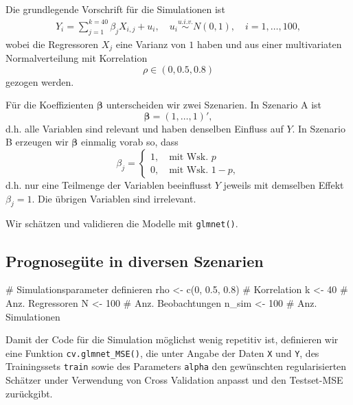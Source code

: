 \documentclass[
  a4paper,
  DIV=11,
  oneside]{scrreprt}
\newenvironment{Shaded}{\begin{snugshade}}{\end{snugshade}}
\newcommand{\CommentTok}[1]{\textcolor[rgb]{0.37,0.37,0.37}{#1}}
\newcommand{\DecValTok}[1]{\textcolor[rgb]{0.68,0.00,0.00}{#1}}
\newcommand{\FloatTok}[1]{\textcolor[rgb]{0.68,0.00,0.00}{#1}}
\newcommand{\FunctionTok}[1]{\textcolor[rgb]{0.28,0.35,0.67}{#1}}
\newcommand{\NormalTok}[1]{\textcolor[rgb]{0.00,0.23,0.31}{#1}}
\newcommand{\OtherTok}[1]{\textcolor[rgb]{0.00,0.23,0.31}{#1}}
\begin{document}
Die grundlegende Vorschrift für die Simulationen ist \begin{align*}
  Y_i = \sum_{j=1}^{k=40} \beta_j X_{i,j} + u_i, \quad u_i \overset{u.i.v.}{\sim} N(0,1), \quad i=1,\dots,100,
\end{align*} wobei die Regressoren \(X_j\) eine Varianz von \(1\) haben
und aus einer multivariaten Normalverteilung mit Korrelation
\[\rho\in(0,0.5,0.8)\] gezogen werden.

Für die Koeffizienten \(\boldsymbol{\beta}\) unterscheiden wir zwei
Szenarien. In Szenario A ist \[\boldsymbol{\beta} = (1,\dots,1)',\] d.h.
alle Variablen sind relevant und haben denselben Einfluss auf \(Y\). In
Szenario B erzeugen wir \(\boldsymbol{\beta}\) einmalig vorab so, dass
\[\beta_j = \begin{cases}1,\quad \text{mit Wsk.  }p\\ 0,\quad \text{mit Wsk.  }1-p, \end{cases}\]
d.h. nur eine Teilmenge der Variablen beeinflusst \(Y\) jeweils mit
demselben Effekt \(\beta_j = 1\). Die übrigen Variablen sind irrelevant.

Wir schätzen und validieren die Modelle mit \texttt{glmnet()}.

\subsection{Prognosegüte in diversen Szenarien}\label{sec-pdz}

\begin{Shaded}
\begin{Highlighting}[]
\CommentTok{\# Simulationsparameter definieren}
\NormalTok{rho }\OtherTok{\textless{}{-}} \FunctionTok{c}\NormalTok{(}\DecValTok{0}\NormalTok{, }\FloatTok{0.5}\NormalTok{, }\FloatTok{0.8}\NormalTok{)   }\CommentTok{\# Korrelation}
\NormalTok{k }\OtherTok{\textless{}{-}} \DecValTok{40}                 \CommentTok{\# Anz. Regressoren}
\NormalTok{N }\OtherTok{\textless{}{-}} \DecValTok{100}                \CommentTok{\# Anz. Beobachtungen}
\NormalTok{n\_sim }\OtherTok{\textless{}{-}} \DecValTok{100}            \CommentTok{\# Anz. Simulationen}
\end{Highlighting}
\end{Shaded}

Damit der Code für die Simulation möglichst wenig repetitiv ist,
definieren wir eine Funktion \texttt{cv.glmnet\_MSE()}, die unter Angabe
der Daten \texttt{X} und \texttt{Y}, des Trainingssets \texttt{train}
sowie des Parameters \texttt{alpha} den gewünschten regularisierten
Schätzer under Verwendung von Cross Validation anpasst und den
Testset-MSE zurückgibt.
\end{document}

